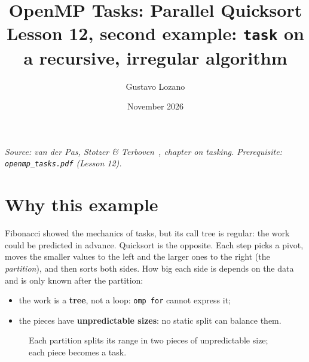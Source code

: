 \documentclass[11pt,a4paper]{article}
\title{\textbf{OpenMP Tasks: Parallel Quicksort}\\[4pt]\large Lesson 12, second example: \texttt{task} on a recursive, irregular algorithm}
\author{Gustavo Lozano}
\date{November 2026}
\let\origtexttt\texttt
\renewcommand{\texttt}[1]{\textcolor{black!60}{\origtexttt{#1}}}
\begin{document}
\maketitle

\noindent\textit{\small Source: van der Pas, Stotzer \& Terboven~\cite{vdp}, chapter on
tasking. Prerequisite: \texttt{openmp\_tasks.pdf} (Lesson 12).}

\section{Why this example}
Fibonacci showed the mechanics of tasks, but its call tree is regular: the work could be
predicted in advance. Quicksort is the opposite. Each step picks a pivot, moves the smaller
values to the left and the larger ones to the right (the \emph{partition}), and then sorts
both sides. How big each side is depends on the data and is only known after the
partition:
\begin{itemize}
  \item the work is a \textbf{tree}, not a loop: \texttt{omp for} cannot express it;
  \item the pieces have \textbf{unpredictable sizes}: no static split can balance them.
\end{itemize}

\begin{figure}[H]
\centering
{}
\caption{Each partition splits its range in two pieces of unpredictable size; each piece
becomes a task.}
\end{figure}
\end{document}
